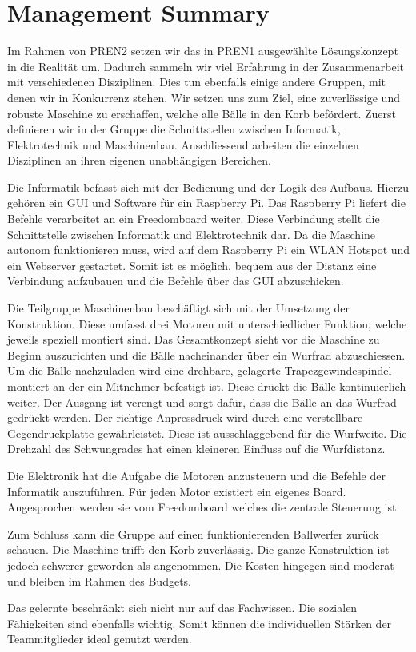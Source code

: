 \section{Management Summary}

Im Rahmen von PREN2 setzen wir das in PREN1 ausgewählte Lösungskonzept in die Realität um. Dadurch sammeln wir viel Erfahrung in der Zusammenarbeit mit verschiedenen Disziplinen. Dies tun ebenfalls einige andere Gruppen, mit denen wir in Konkurrenz stehen. Wir setzen uns zum Ziel, eine zuverlässige und robuste Maschine zu erschaffen, welche alle Bälle in den Korb befördert.
Zuerst definieren wir in der Gruppe die Schnittstellen zwischen Informatik, Elektrotechnik und Maschinenbau. Anschliessend arbeiten die einzelnen Disziplinen an ihren eigenen unabhängigen Bereichen.

Die Informatik befasst sich mit der Bedienung und der Logik des Aufbaus. Hierzu gehören ein GUI und Software für ein Raspberry Pi. Das Raspberry Pi liefert die Befehle verarbeitet an ein Freedomboard weiter. Diese Verbindung stellt die Schnittstelle zwischen Informatik und Elektrotechnik dar. Da die Maschine autonom funktionieren muss, wird auf dem Raspberry Pi ein WLAN Hotspot und ein Webserver gestartet. Somit ist es möglich, bequem aus der Distanz eine Verbindung aufzubauen und die Befehle über das GUI abzuschicken.

Die Teilgruppe Maschinenbau beschäftigt sich mit der Umsetzung der Konstruktion. Diese umfasst drei Motoren mit unterschiedlicher Funktion, welche jeweils speziell montiert sind. Das Gesamtkonzept sieht vor die Maschine zu Beginn auszurichten und die Bälle nacheinander über ein Wurfrad abzuschiessen. Um die Bälle nachzuladen wird eine drehbare, gelagerte Trapezgewindespindel montiert an der ein Mitnehmer befestigt ist. Diese drückt die Bälle kontinuierlich weiter. Der Ausgang ist verengt und sorgt dafür, dass die Bälle an das Wurfrad gedrückt werden. Der richtige Anpressdruck wird durch eine verstellbare Gegendruckplatte gewährleistet. Diese ist ausschlaggebend für die Wurfweite. Die Drehzahl des Schwungrades hat einen kleineren Einfluss auf die Wurfdistanz.

Die Elektronik hat die Aufgabe die Motoren anzusteuern und die Befehle der Informatik auszuführen.
Für jeden Motor existiert ein eigenes Board. Angesprochen werden sie vom Freedomboard welches die zentrale Steuerung ist.

Zum Schluss kann die Gruppe auf einen funktionierenden Ballwerfer zurück schauen. Die Maschine trifft den Korb zuverlässig. Die ganze Konstruktion ist jedoch schwerer geworden als angenommen. Die Kosten hingegen sind moderat und bleiben im Rahmen des Budgets.

Das gelernte beschränkt sich nicht nur auf das Fachwissen. Die sozialen Fähigkeiten sind ebenfalls wichtig. Somit können die individuellen Stärken der Teammitglieder ideal genutzt werden.